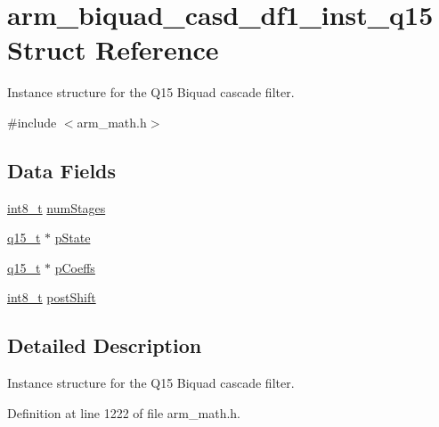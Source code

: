 \hypertarget{structarm__biquad__casd__df1__inst__q15}{\section{arm\-\_\-biquad\-\_\-casd\-\_\-df1\-\_\-inst\-\_\-q15 Struct Reference}
\label{structarm__biquad__casd__df1__inst__q15}
}


Instance structure for the Q15 Biquad cascade filter.  




{\ttfamily \#include $<$arm\-\_\-math.\-h$>$}

\subsection*{Data Fields}
\begin{DoxyCompactItemize}
\item 
\hyperlink{stdint_8h_ad566f6541e98b74246db1a3a3a85ad49}{int8\-\_\-t} \hyperlink{structarm__biquad__casd__df1__inst__q15_ad6d95e70abcf4ff1300181415ad92153}{num\-Stages}
\item 
\hyperlink{arm__math_8h_ab5a8fb21a5b3b983d5f54f31614052ea}{q15\-\_\-t} $\ast$ \hyperlink{structarm__biquad__casd__df1__inst__q15_a5481104ef2f8f81360b80b47d69ae932}{p\-State}
\item 
\hyperlink{arm__math_8h_ab5a8fb21a5b3b983d5f54f31614052ea}{q15\-\_\-t} $\ast$ \hyperlink{structarm__biquad__casd__df1__inst__q15_a1edaacdebb5b09d7635bf20c779855fc}{p\-Coeffs}
\item 
\hyperlink{stdint_8h_ad566f6541e98b74246db1a3a3a85ad49}{int8\-\_\-t} \hyperlink{structarm__biquad__casd__df1__inst__q15_ada7e9d6269e6ed4eacf8f68729e9832d}{post\-Shift}
\end{DoxyCompactItemize}


\subsection{Detailed Description}
Instance structure for the Q15 Biquad cascade filter. 

Definition at line 1222 of file arm\-\_\-math.\-h.



